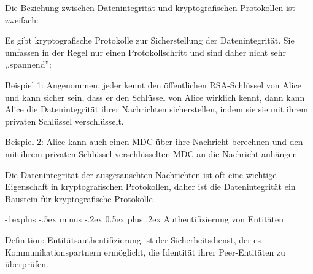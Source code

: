 \documentclass[a4paper]{article}
\makeatletter
\renewcommand{\subsection}{\@startsection{subsection}{2}{0mm}%
 {-1explus -.5ex minus -.2ex}%
 {0.5ex plus .2ex}%
 {\normalfont\normalsize\bfseries}}
\makeatother
\begin{document}
\begin{multicols}{3}
      \begin{itemize*}
            \item Die Beziehung zwischen Datenintegrität und kryptografischen
            Protokollen ist zweifach:
            \begin{itemize*}
                  \item Es gibt kryptografische Protokolle zur Sicherstellung der Datenintegrität. Sie umfassen in der Regel nur einen Protokollschritt und sind daher nicht sehr ,,spannend'':
                  \begin{itemize*} \item Beispiel 1: Angenommen, jeder kennt den öffentlichen RSA-Schlüssel von Alice und kann sicher sein, dass er den Schlüssel von Alice wirklich kennt, dann kann Alice die Datenintegrität ihrer Nachrichten sicherstellen, indem sie sie mit ihrem privaten Schlüssel verschlüsselt. \item Beispiel 2: Alice kann auch einen MDC über ihre Nachricht berechnen und den mit ihrem privaten Schlüssel verschlüsselten MDC an die Nachricht anhängen \end{itemize*}
                  \item Die Datenintegrität der ausgetauschten Nachrichten ist oft eine wichtige Eigenschaft in kryptografischen Protokollen, daher ist die Datenintegrität ein Baustein für kryptografische Protokolle
            \end{itemize*}
      \end{itemize*}


      \subsection{Authentifizierung von
            Entitäten}

      Definition: Entitätsauthentifizierung ist der Sicherheitsdienst, der es
      Kommunikationspartnern ermöglicht, die Identität ihrer Peer-Entitäten zu
      überprüfen.


\end{multicols}
\end{document}
